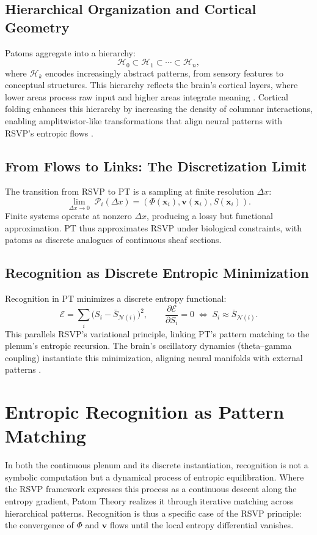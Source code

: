 \documentclass[11pt]{article}
\begin{document}
\subsection{Hierarchical Organization and Cortical Geometry}
Patoms aggregate into a hierarchy:
\[
\mathcal{H}_0 \subset \mathcal{H}_1 \subset \cdots \subset \mathcal{H}_n,
\]
where $\mathcal{H}_k$ encodes increasingly abstract patterns, from sensory features to conceptual structures. This hierarchy reflects the brain’s cortical layers, where lower areas process raw input and higher areas integrate meaning \citep{alivisatos2012brain}. Cortical folding enhances this hierarchy by increasing the density of columnar interactions, enabling amplitwistor-like transformations that align neural patterns with RSVP’s entropic flows \citep{hoffman1998visual}.

\subsection{From Flows to Links: The Discretization Limit}
The transition from RSVP to PT is a sampling at finite resolution $\Delta x$:
\[
\lim_{\Delta x \to 0} \;\mathcal{P}_i(\Delta x)
= (\Phi(\mathbf{x}_i), \mathbf{v}(\mathbf{x}_i), S(\mathbf{x}_i)).
\]
Finite systems operate at nonzero $\Delta x$, producing a lossy but functional approximation. PT thus approximates RSVP under biological constraints, with patoms as discrete analogues of continuous sheaf sections.

\subsection{Recognition as Discrete Entropic Minimization}
Recognition in PT minimizes a discrete entropy functional:
\[
\mathcal{E} = \sum_i \big(S_i - \bar{S}_{\mathcal{N}(i)}\big)^2,
\qquad
\frac{\partial \mathcal{E}}{\partial S_i} = 0
\;\Longleftrightarrow\;
S_i \approx \bar{S}_{\mathcal{N}(i)}.
\]
This parallels RSVP’s variational principle, linking PT’s pattern matching to the plenum’s entropic recursion. The brain’s oscillatory dynamics (theta--gamma coupling) instantiate this minimization, aligning neural manifolds with external patterns \citep{alivisatos2012brain, ball2019superglue}.

\section{Entropic Recognition as Pattern Matching}
In both the continuous plenum and its discrete instantiation, recognition is not a symbolic computation but a dynamical process of entropic equilibration. Where the RSVP framework expresses this process as a continuous descent along the entropy gradient, Patom Theory realizes it through iterative matching across hierarchical patterns. Recognition is thus a specific case of the RSVP principle: the convergence of $\Phi$ and $\mathbf{v}$ flows until the local entropy differential vanishes.
\end{document}
